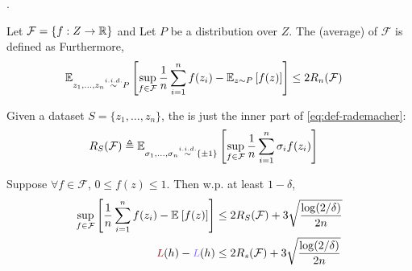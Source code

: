 \documentclass[11pt]{article}
\begin{document}
. 





\begin{definition}
	Let $\mathcal F = \{ f : Z \to \R  \}$ and Let $P$ be a distribution over $Z$. The (average)  of $\mathcal F$ is defined as 
	Furthermore,
	\begin{align}
		\E[z_1, \ldots, z_n \overset{i.i.d.}{\sim} P]{ 
			\sup_{f \in \mathcal F} \inv{n} \insum f(z_i) - \E[z \sim P]{f(z)}
		} &\leq 2 R_n(\mathcal F)
	\end{align}
\end{definition}

\begin{definition}
	Given a dataset $S = \{ z_1, \ldots, z_n \}$, the  is just the inner part of \ref{eq:def-rademacher}:
	\begin{align}
		R_S(\mathcal F) &\triangleq \E[\sigma_1, \ldots, \sigma_n \overset{i.i.d.}{\sim}  \{ \pm 1 \} ]{
			\sup_{f \in \mathcal F} \inv{n} \insum \sigma_i f(z_i)
		}
	\end{align}
	
	Suppose $\forall f \in \mathcal F$, $0 \leq f(z) \leq 1$. Then w.p. at least $1 - \delta$,
	\begin{align}
		\sup_{f \in \mathcal F} \left[	  
				\inv{n}\insum f(z_i) - \E{f(z)}
			\right]
			&\leq 2 R_S(\mathcal F) + 3 \sqrt{\frac{\log(2 / \delta)}{2n}} \\
		\mred{L}(h) - \mblue{L}(h)
			&\leq 2 R_s(\mathcal F) + 3 \sqrt{\frac{\log(2 / \delta)}{2n}}
	\end{align}
	
\end{definition}
\end{document}
